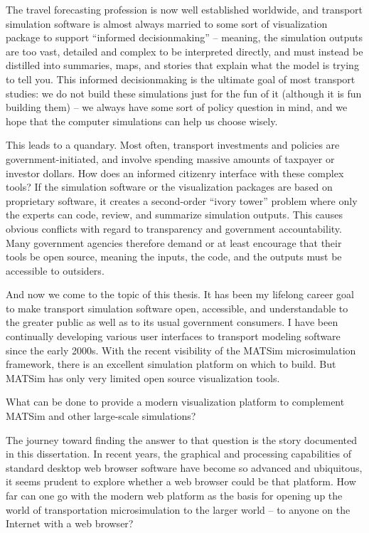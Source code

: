 The travel forecasting profession is now well established worldwide, and transport simulation software is almost always married to some sort of visualization package to support ``informed decisionmaking'' -- meaning, the simulation outputs are too vast, detailed and complex to be interpreted directly, and must instead be distilled into summaries, maps, and stories that explain what the model is trying to tell you. This informed decisionmaking is the ultimate goal of most transport studies: we do not build these simulations just for the fun of it (although it is fun building them) -- we always have some sort of policy question in mind, and we hope that the computer simulations can help us choose wisely.

This leads to a quandary. Most often, transport investments and policies are government-initiated, and involve spending massive amounts of taxpayer or investor dollars. How does an informed citizenry interface with these complex tools? If the simulation software or the visualization packages are based on proprietary software, it creates a second-order ``ivory tower'' problem where only the experts can code, review, and summarize simulation outputs. This causes obvious conflicts with regard to transparency and government accountability. Many government agencies therefore demand or at least encourage that their tools be open source, meaning the inputs, the code, and the outputs must be accessible to outsiders.

And now we come to the topic of this thesis. It has been my lifelong career goal to make transport simulation software open, accessible, and understandable to the greater public as well as to its usual government consumers. I have been continually developing various user interfaces to transport modeling software since the early 2000s. With the recent visibility of the \gls{MATSim} microsimulation framework, there is an excellent simulation platform on which to build. But MATSim has only very limited open source visualization tools.

What can be done to provide a modern visualization platform to complement MATSim and other large-scale simulations?

The journey toward finding the answer to that question is the story documented in this dissertation. In recent years, the graphical and processing capabilities of standard desktop web browser software have become so advanced and ubiquitous, it seems prudent to explore whether a web browser could be that platform. How far can one go with the modern web platform as the basis for opening up the world of transportation microsimulation to the larger world -- to anyone on the Internet with a web browser?

